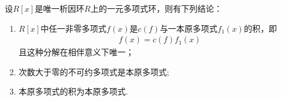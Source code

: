 \documentclass[../../main.tex]{subfiles}%
\begin{document}
\begin{theorem}\label{theorem:抽象代数--定理2.7.1}
设$R[x]$是唯一析因环$R$上的一元多项式环，则有下列结论：
\begin{enumerate}[(1)]
\item\label{theorem:抽象代数--定理2.7.1-1} $R[x]$中任一非零多项式$f(x)$是$c(f)$与一本原多项式$f_1(x)$的积，即
\begin{align}
f(x) = c(f)f_1(x) \label{eq:::--298fh232.7.3}
\end{align}
且这种分解在相伴意义下唯一；

\item\label{theorem:抽象代数--定理2.7.1-2} 次数大于零的不可约多项式是本原多项式;

\item\label{theorem:抽象代数--定理2.7.1-3} 本原多项式的积为本原多项式.
\end{enumerate}
\end{theorem}
\end{document}
